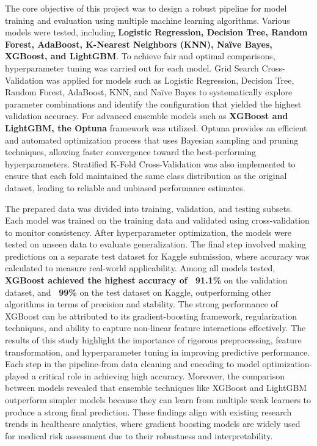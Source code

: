 The core objective of this project was to design a robust pipeline for model training and evaluation using multiple machine learning algorithms.
Various models were tested, including \textbf{Logistic Regression, Decision Tree, Random Forest, AdaBoost, K-Nearest Neighbors (KNN), Naïve Bayes, XGBoost, and LightGBM}. To achieve fair and optimal comparisons, hyperparameter tuning was carried out for each model.
Grid Search Cross-Validation was applied for models such as Logistic Regression, Decision Tree, Random Forest, AdaBoost, KNN, and Naïve Bayes to systematically explore parameter combinations and identify the configuration that yielded the highest validation accuracy.
For advanced ensemble models such as \textbf{XGBoost and LightGBM, the Optuna} framework was utilized.
Optuna provides an efficient and automated optimization process that uses Bayesian sampling and pruning techniques, allowing faster convergence toward the best-performing hyperparameters.
Stratified K-Fold Cross-Validation was also implemented to ensure that each fold maintained the same class distribution as the original dataset, leading to reliable and unbiased performance estimates.

The prepared data was divided into training, validation, and testing subsets.
Each model was trained on the training data and validated using cross-validation to monitor consistency.
After hyperparameter optimization, the models were tested on unseen data to evaluate generalization.
The final step involved making predictions on a separate test dataset for Kaggle submission, where accuracy was calculated to measure real-world applicability.
Among all models tested, \textbf{XGBoost achieved the highest accuracy of ~91.1\%} on the validation dataset, and \textbf{~99\%} on the test dataset on Kaggle, outperforming other algorithms in terms of precision and stability.
The strong performance of XGBoost can be attributed to its gradient-boosting framework, regularization techniques, and ability to capture non-linear feature interactions effectively.
The results of this study highlight the importance of rigorous preprocessing, feature transformation, and hyperparameter tuning in improving predictive performance.
Each step in the pipeline-from data cleaning and encoding to model optimization- played a critical role in achieving high accuracy.
Moreover, the comparison between models revealed that ensemble techniques like XGBoost and LightGBM outperform simpler models because they can learn from multiple weak learners to produce a strong final prediction.
These findings align with existing research trends in healthcare analytics, where gradient boosting models are widely used for medical risk assessment due to their robustness and interpretability.

